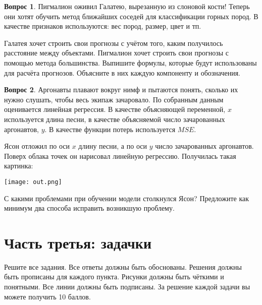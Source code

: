 \documentclass[12pt]{article}
\theoremstyle{definition}
\newtheorem{question}{Вопрос}
\begin{document}
\vspace{6cm} 


\begin{question}
Пигмалион оживил Галатею, вырезанную из слоновой кости! Теперь они хотят обучить метод ближайших соседей для классификации горных пород. В качестве признаков используются: вес пород, размер, цвет и тп. 

Галатея хочет строить свои прогнозы с учётом того, каким получилось расстояние между объектами. Пигмалион хочет строить свои прогнозы с помощью метода большинства. Выпишите формулы, которые будут использованы для расчёта прогнозов. Объясните в них каждую компоненту и обозначения. 
\end{question}

\vspace{5cm} 

\newpage 

\begin{question}
Аргонавты плавают вокруг нимф и пытаются понять, сколько их нужно слушать, чтобы весь экипаж зачаровало. По собранным данным оценивается линейная регрессия. В качестве объясняющей переменной, $x$ используется длина песни, в качестве объясняемой число зачарованных аргонавтов, $y$.  В качестве функции потерь используется $MSE.$ 

Ясон отложил по оси $x$ длину песни, а по оси $y$ число зачарованных аргонавтов. Поверх облака точек он нарисовал линейную регрессию. Получилась такая картинка: 
\begin{center}
  \texttt{[image: out.png]}
\end{center}
\end{question}

С какими проблемами при обучении модели столкнулся Ясон? Предложите как минимум два способа исправить возникшую проблему. 

\vspace{5cm} 



\newpage 

\section*{Часть третья: задачки}

Решите все задания. Все ответы должны быть обоснованы. Решения должны быть прописаны для каждого пункта. Рисунки должны быть чёткими и понятными. Все линии должны быть подписаны. За решение каждой задачи вы можете получить 10 баллов.
\end{document}
